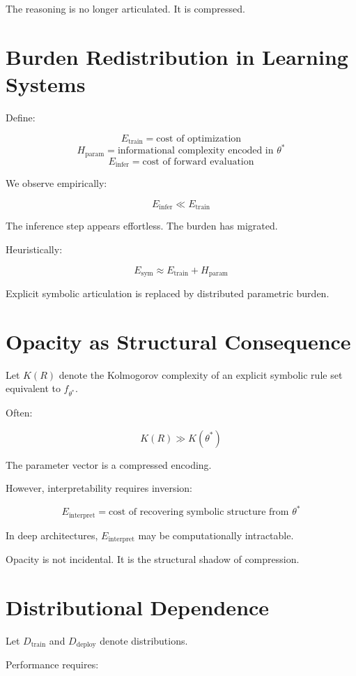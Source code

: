 \documentclass[11pt,openany]{book}
\begin{document}
The reasoning is no longer articulated.
It is compressed.

\section{Burden Redistribution in Learning Systems}

Define:

\[
E_{\text{train}} = \text{cost of optimization}
\]
\[
H_{\text{param}} = \text{informational complexity encoded in } \theta^*
\]
\[
E_{\text{infer}} = \text{cost of forward evaluation}
\]

We observe empirically:

\[
E_{\text{infer}} \ll E_{\text{train}}
\]

The inference step appears effortless.
The burden has migrated.

Heuristically:

\[
E_{\text{sym}} \approx E_{\text{train}} + H_{\text{param}}
\]

Explicit symbolic articulation is replaced by distributed parametric burden.

\section{Opacity as Structural Consequence}

Let $K(R)$ denote the Kolmogorov complexity of an explicit symbolic rule set equivalent to $f_{\theta^*}$.

Often:

\[
K(R) \gg K(\theta^*)
\]

The parameter vector is a compressed encoding.

However, interpretability requires inversion:

\[
E_{\text{interpret}} = \text{cost of recovering symbolic structure from } \theta^*
\]

In deep architectures, $E_{\text{interpret}}$ may be computationally intractable.

Opacity is not incidental.
It is the structural shadow of compression.

\section{Distributional Dependence}

Let $D_{\text{train}}$ and $D_{\text{deploy}}$ denote distributions.

Performance requires:
\end{document}
